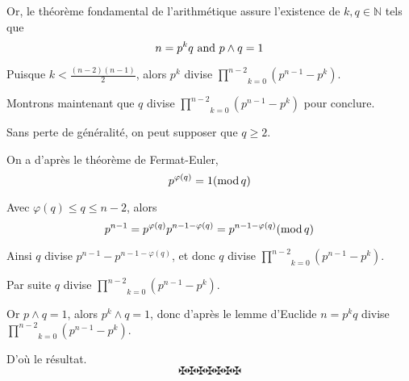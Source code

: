 Or, le th{\'e}or{\`e}me fondamental de l'arithm{\'e}tique assure l'existence
de $k, q \in \mathbb{N}$ tels que
\[ n = p^k q \text{ and } p \wedge q = 1 \]


Puisque $k < \frac{(n - 2) (n - 1)}{2}$, alors $p^k$ divise $\underset{k =
0}{\overset{n - 2}{\prod}} (p^{n - 1} - p^k)$.

Montrons maintenant que $q$ divise $\underset{k = 0}{\overset{n - 2}{\prod}}
(p^{n - 1} - p^k)$ pour conclure.

Sans perte de g{\'e}n{\'e}ralit{\'e}, on peut supposer que $q \geqslant 2$.

On a d'apr{\`e}s le th{\'e}or{\`e}me de Fermat-Euler,
\[ p^{\varphi (q)} = 1 (\operatorname{mod} q) \]


Avec $\varphi (q) \leqslant q \leqslant n - 2$, alors
\[ p^{n - 1} = p^{\varphi (q)} p^{n - 1 - \varphi (q)} = p^{n - 1 - \varphi
   (q)}  (\operatorname{mod} q) \]


Ainsi $q$ divise $p^{n - 1} - p^{n - 1 - \varphi (q)}$, et donc $q$ divise
$\underset{}{\overset{}{}} \underset{k = 0}{\overset{n - 2}{\prod}} (p^{n - 1}
- p^k)$.

Par suite $q$ divise $\underset{k = 0}{\overset{n - 2}{\prod}} (p^{n - 1} -
p^k)$.

Or $p \wedge q = 1$, alors $p^k \wedge q = 1$, donc d'apr{\`e}s le lemme
d'Euclide $n = p^k q$ divise $\underset{k = 0}{\overset{n - 2}{\prod}} (p^{n -
1} - p^k)$.

D'o{\`u} le r{\'e}sultat.
\[ \maltese \maltese \maltese \maltese \maltese \maltese \maltese \]
